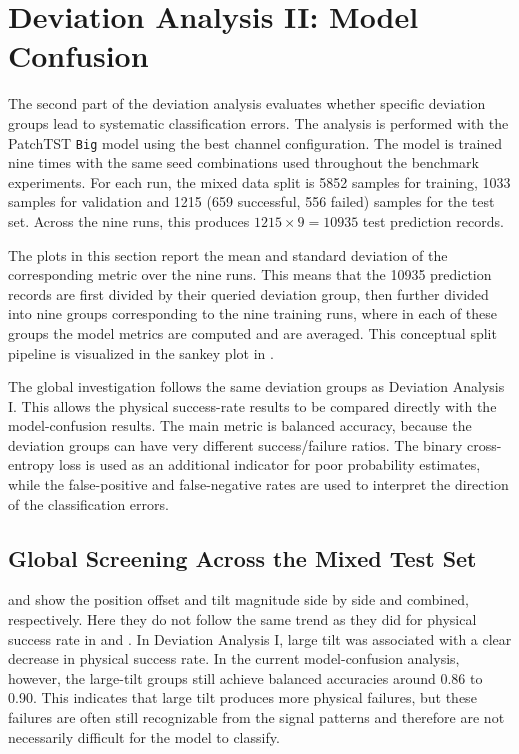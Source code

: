 \section{Deviation Analysis II: Model Confusion}
\label{subsec:results_deviation_analysis_2}

The second part of the deviation analysis evaluates whether specific deviation groups lead to systematic classification errors. The analysis is performed with the PatchTST \texttt{Big} model using the best channel configuration. The model is trained nine times with the same seed combinations used throughout the benchmark experiments. For each run, the mixed data split is 5852 samples for training, 1033 samples for validation and 1215 (659 successful, 556 failed) samples for the test set. Across the nine runs, this produces $1215\times 9 = 10935$ test prediction records.

The plots in this section report the mean and standard deviation of the corresponding metric over the nine runs. This means that the 10935 prediction records are first divided by their queried deviation group, then further divided into nine groups corresponding to the nine training runs, where in each of these groups the model metrics are computed and are averaged. This conceptual split pipeline is visualized in the sankey plot in .

The global investigation follows the same deviation groups as Deviation Analysis I. This allows the physical success-rate results to be compared directly with the model-confusion results. The main metric is balanced accuracy, because the deviation groups can have very different success/failure ratios. The binary cross-entropy loss is used as an additional indicator for poor probability estimates, while the false-positive and false-negative rates are used to interpret the direction of the classification errors.

\subsection{Global Screening Across the Mixed Test Set}
\label{subsec:da2_global_screening}

 and  show the position offset and tilt magnitude side by side and combined, respectively. Here they do not follow the same trend as they did for physical success rate in  and . In Deviation Analysis I, large tilt was associated with a clear decrease in physical success rate. In the current model-confusion analysis, however, the large-tilt groups still achieve balanced accuracies around 0.86 to 0.90. This indicates that large tilt produces more physical failures, but these failures are often still recognizable from the signal patterns and therefore are not necessarily difficult for the model to classify.

